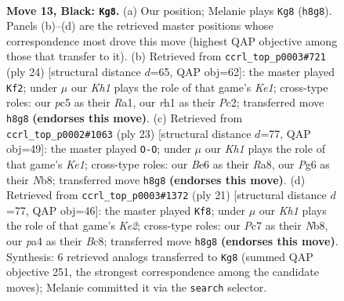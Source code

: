 \documentclass[11pt]{article}
\begin{document}
\clearpage

\begin{figure}[p]\centering
\begin{subfigure}{0.46\textwidth}\centering
\resizebox{\linewidth}{!}{%
\newchessgame
\chessboard[
  setfen={rn1r3k/ppp2pbp/4bnp1/1PP1p3/P3P2P/2N2N2/4BPP1/R1B1K2R b KQ - 0 13},
  showmover=false,
  pgfstyle=straightmove, color=movearrow, markmove={h8-g8}
]}
\caption{}
\end{subfigure}\hfill
\begin{subfigure}{0.46\textwidth}\centering
\resizebox{\linewidth}{!}{%
\newchessgame
\chessboard[
  setfen={r1b1kb1r/ppn2pp1/2p2n2/3p3p/3P1N2/2NB1P2/PPPB2PP/R3K2R w KQkq - 0 13},
  showmover=false,
  pgfstyle=straightmove, color=movearrow, markmove={e1-f2}
]}
\caption{}
\end{subfigure}
\\[4pt]
\begin{subfigure}{0.46\textwidth}\centering
\resizebox{\linewidth}{!}{%
\newchessgame
\chessboard[
  setfen={rn2k2r/2pbbp2/5n1p/pp1P2p1/3P1p2/PB3N2/1PP3PP/RNB2RK1 b kq - 1 12},
  showmover=false,
  pgfstyle=straightmove, color=movearrow, markmove={e8-g8}
]}
\caption{}
\end{subfigure}\hfill
\begin{subfigure}{0.46\textwidth}\centering
\resizebox{\linewidth}{!}{%
\newchessgame
\chessboard[
  setfen={rnb4r/p1p1kp2/1p1b1n1p/3P2p1/2PP1p2/1B3N2/PP4PP/RNB2RK1 b - - 0 11},
  showmover=false,
  pgfstyle=straightmove, color=movearrow, markmove={e7-f8}
]}
\caption{}
\end{subfigure}
\caption{\textbf{Move 13, Black: \texttt{Kg8}.} (a) Our position; Melanie plays \texttt{Kg8} (\texttt{h8g8}). Panels (b)--(d) are the retrieved master positions whose correspondence most drove this move (highest QAP objective among those that transfer to it). (b) Retrieved from \texttt{ccrl\_top\_p0003\#721} (ply 24) [structural distance $d$=65, QAP obj=62]: the master played \texttt{Kf2}; under $\mu$ our \emph{Kh1} plays the role of that game's \emph{Ke1}; cross-type roles: our \emph{p}c5 as their \emph{R}a1, our \emph{r}h1 as their \emph{P}c2; transferred move \texttt{h8g8} \textbf{(endorses this move)}. (c) Retrieved from \texttt{ccrl\_top\_p0002\#1063} (ply 23) [structural distance $d$=77, QAP obj=49]: the master played \texttt{O-O}; under $\mu$ our \emph{Kh1} plays the role of that game's \emph{Ke1}; cross-type roles: our \emph{B}e6 as their \emph{R}a8, our \emph{P}g6 as their \emph{N}b8; transferred move \texttt{h8g8} \textbf{(endorses this move)}. (d) Retrieved from \texttt{ccrl\_top\_p0003\#1372} (ply 21) [structural distance $d$=77, QAP obj=46]: the master played \texttt{Kf8}; under $\mu$ our \emph{Kh1} plays the role of that game's \emph{Ke2}; cross-type roles: our \emph{P}c7 as their \emph{N}b8, our \emph{p}a4 as their \emph{B}c8; transferred move \texttt{h8g8} \textbf{(endorses this move)}. Synthesis: 6 retrieved analogs transferred to \texttt{Kg8} (summed QAP objective 251, the strongest correspondence among the candidate moves); Melanie committed it via the \texttt{search} selector.}
\label{fig:thought-m25}
\end{figure}
\end{document}
